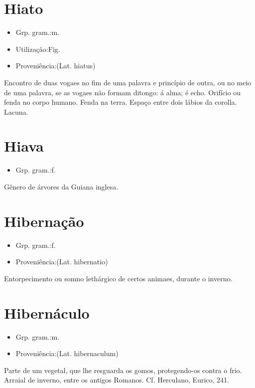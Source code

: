 \documentclass{article}
\begin{document}
\section{Hiato}
\begin{itemize}
\item {Grp. gram.:m.}
\end{itemize}
\begin{itemize}
\item {Utilização:Fig.}
\end{itemize}
\begin{itemize}
\item {Proveniência:(Lat. \textunderscore hiatus\textunderscore )}
\end{itemize}
Encontro de duas vogaes no fim de uma palavra e princípio de outra, ou no meio de uma palavra, se as vogaes não formam ditongo: \textunderscore á alma\textunderscore ; \textunderscore é echo\textunderscore .
Orifício ou fenda no corpo humano.
Fenda na terra.
Espaço entre dois lábios da corolla.
Lacuna.
\section{Hiava}
\begin{itemize}
\item {Grp. gram.:f.}
\end{itemize}
Gênero de árvores da Guiana inglesa.
\section{Hibernação}
\begin{itemize}
\item {Grp. gram.:f.}
\end{itemize}
\begin{itemize}
\item {Proveniência:(Lat. \textunderscore hibernatio\textunderscore )}
\end{itemize}
Entorpecimento ou somno lethárgico de certos animaes, durante o inverno.
\section{Hibernáculo}
\begin{itemize}
\item {Grp. gram.:m.}
\end{itemize}
\begin{itemize}
\item {Proveniência:(Lat. \textunderscore hibernaculum\textunderscore )}
\end{itemize}
Parte de um vegetal, que lhe resguarda os gomos, protegendo-os contra o frio.
Arraial de inverno, entre os antigos Romanos. Cf. Herculano, \textunderscore Eurico\textunderscore , 241.
\end{document}
